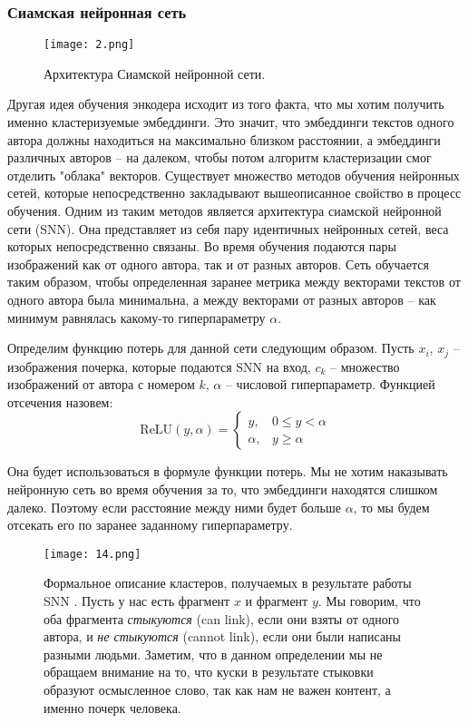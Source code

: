 \subsubsection{Сиамская нейронная сеть}

    \begin{figure}[htbp]
        \centering
        \texttt{[image: 2.png]}
        \caption{Архитектура Сиамской нейронной сети.}
        \label{fig:snn}
    \end{figure}

    Другая идея обучения энкодера исходит из того факта, что мы хотим получить именно кластеризуемые эмбеддинги. Это значит, что эмбеддинги текстов одного автора должны находиться на максимально близком расстоянии, а эмбеддинги различных авторов -- на далеком, чтобы потом алгоритм кластеризации смог отделить "облака" векторов. Существует множество методов обучения нейронных сетей, которые непосредственно закладывают вышеописанное свойство в процесс обучения. Одним из таким методов является архитектура сиамской нейронной сети (SNN). Она представляет из себя пару идентичных нейронных сетей, веса которых непосредственно связаны. Во время обучения подаются пары изображений как от одного автора, так и от разных авторов. Сеть обучается таким образом, чтобы определенная заранее метрика между векторами текстов от одного автора была минимальна, а между векторами от разных авторов -- как минимум равнялась какому-то гиперпараметру $\alpha$. 

    Определим функцию потерь для данной сети следующим образом. Пусть
$x_i$, $x_j$ -- изображения почерка, которые подаются SNN на вход, $c_k$ -- множество изображений от автора с номером $k$, $\alpha$ -- числовой гиперпараметр. Функцией отсечения назовем: 
$$
    \text{ReLU}(y, \alpha) = 
\begin{cases}
    y,& 0 \le y < \alpha \\
    \alpha,& y \geq \alpha
\end{cases}
$$

\bigbreak
\noindent
Она будет использоваться в формуле функции потерь. Мы не хотим наказывать нейронную сеть во время обучения за то, что эмбеддинги находятся слишком далеко. Поэтому если расстояние между ними будет больше $\alpha$, то мы будем отсекать его по заранее заданному гиперпараметру. 

\begin{figure}[htbp]
    \centering
    \texttt{[image: 14.png]}
    \caption{Формальное описание кластеров, получаемых в результате работы SNN \cite{snn}. Пусть у нас есть фрагмент $x$ и фрагмент $y$. Мы говорим, что оба фрагмента \textit{стыкуются} (can link), если они взяты от одного автора, и \textit{не стыкуются} (cannot link), если они были написаны разными людьми. Заметим, что в данном определении мы не обращаем внимание на то, что куски в результате стыковки образуют осмысленное слово, так как нам не важен контент, а именно почерк человека.}
    \label{fig:autoencoder}
\end{figure}

